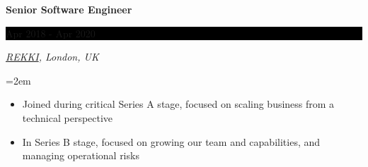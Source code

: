 \documentclass[paper=a4,fontsize=11pt]{scrartcl} %
\newcommand{\EducationEntry}[4]{
    \noindent \textbf{#1} \hfill        %
    \colorbox{Black}{
      \parbox{8.5em}{
      \hfill\color{White}#2}} \par      %
    \noindent \textit{#3} \par          %
    \noindent\hangindent=2em\hangafter=0 \small #4 %
    \normalsize \par}
\newcommand{\WorkEntry}[4]{             %
    \noindent \textbf{#1} \hfill        %
    \colorbox{Black}{%
      \parbox{9em}{%
      \hfill\color{White}#2}} \par      %
        \noindent \textit{#3} \par      %
    \noindent\hangindent=2em\hangafter=0 \small #4 %
    \normalsize \par}
\begin{document}
\WorkEntry{Senior Software Engineer}{Apr 2018 - Apr 2020}
{\href{https://rekki.com/}{REKKI}, London, UK}
{
  \begin{itemize} \itemsep -1pt
    \item Joined during critical Series A stage, focused on scaling business from a technical perspective

    \item In Series B stage, focused on growing our team and capabilities, and managing operational risks

\end{itemize}}
\end{document}
